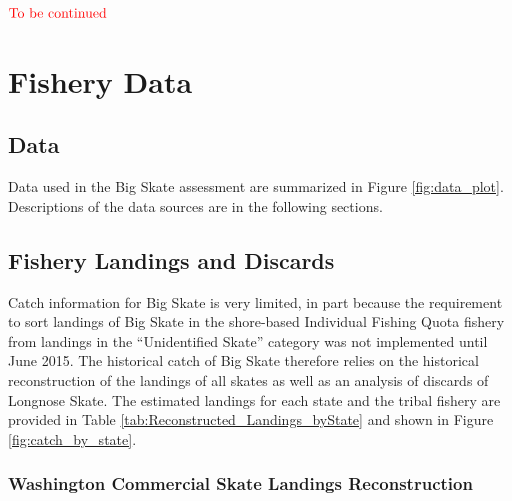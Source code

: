 \documentclass[12pt,]{article}
\begin{document}
\textbf{\(\color{red}{\text{To be continued}}\)}

\FloatBarrier

\newpage
\renewcommand{\thefigure}{\arabic{figure}}
\renewcommand{\thetable}{\arabic{table}}
\setcounter{figure}{0}
\setcounter{table}{0}

\newpage
\renewcommand{\thefigure}{\arabic{figure}}
\renewcommand{\thetable}{\arabic{table}}
\setcounter{figure}{0}
\setcounter{table}{0}

\newpage

\hypertarget{fishery-data}{%
\section{Fishery Data}\label{fishery-data}}

\hypertarget{data}{%
\subsection{Data}\label{data}}

Data used in the Big Skate assessment are summarized in Figure
\ref{fig:data_plot}. Descriptions of the data sources are in the
following sections.

\hypertarget{fishery-landings-and-discards}{%
\subsection{Fishery Landings and
Discards}\label{fishery-landings-and-discards}}

Catch information for Big Skate is very limited, in part because the
requirement to sort landings of Big Skate in the shore-based Individual
Fishing Quota fishery from landings in the ``Unidentified Skate''
category was not implemented until June 2015. The historical catch of
Big Skate therefore relies on the historical reconstruction of the
landings of all skates as well as an analysis of discards of Longnose
Skate. The estimated landings for each state and the tribal fishery are
provided in Table \ref{tab:Reconstructed_Landings_byState} and shown in
Figure \ref{fig:catch_by_state}.

\hypertarget{washington-commercial-skate-landings-reconstruction}{%
\subsubsection{Washington Commercial Skate Landings
Reconstruction}\label{washington-commercial-skate-landings-reconstruction}}
\end{document}
